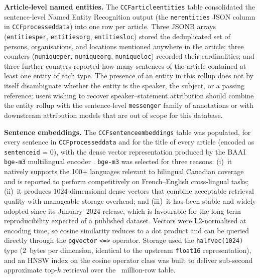\documentclass[12pt]{article}
\renewcommand\_{\texttt{\detokenize{_}\allowbreak}}
\begin{document}
{\bfseries{Article-level named entities.}} The \texttt{CCF\_article\_entities} table consolidated the sentence-level Named Entity Recognition output (the \texttt{ner\_entities} JSON column in \texttt{CCF\_processed\_data}) into one row per article. Three JSONB arrays (\texttt{entities\_per}, \texttt{entities\_org}, \texttt{entities\_loc}) stored the deduplicated set of persons, organisations, and locations mentioned anywhere in the article; three counters (\texttt{n\_unique\_per}, \texttt{n\_unique\_org}, \texttt{n\_unique\_loc}) recorded their cardinalities; and three further counters reported how many sentences of the article contained at least one entity of each type. The presence of an entity in this rollup does not by itself disambiguate whether the entity is the speaker, the subject, or a passing reference; users wishing to recover speaker--statement attribution should combine the entity rollup with the sentence-level \texttt{messenger} family of annotations or with downstream attribution models that are out of scope for this database.

{\bfseries{Sentence embeddings.}} The \texttt{CCF\_sentence\_embeddings} table was populated, for every sentence in \texttt{CCF\_processed\_data} and for the title of every article (encoded as \texttt{sentence\_id} = 0), with the dense vector representation produced by the BAAI \texttt{bge-m3} multilingual encoder \autocite{chen_bge_2024}. \texttt{bge-m3} was selected for three reasons: (i)~it natively supports the 100+ languages relevant to bilingual Canadian coverage and is reported to perform competitively on French--English cross-lingual tasks; (ii)~it produces 1024-dimensional dense vectors that combine acceptable retrieval quality with manageable storage overhead; and (iii)~it has been stable and widely adopted since its January~2024 release, which is favourable for the long-term reproducibility expected of a published dataset. Vectors were L2-normalised at encoding time, so cosine similarity reduces to a dot product and can be queried directly through the \texttt{pgvector} \texttt{<=>} operator. Storage used the \texttt{halfvec(1024)} type ($2$~bytes per dimension, identical to the upstream \texttt{float16} representation), and an HNSW index on the cosine operator class was built to deliver sub-second approximate top-$k$ retrieval over the \CCFsentApprox{}~million-row table.
\end{document}
